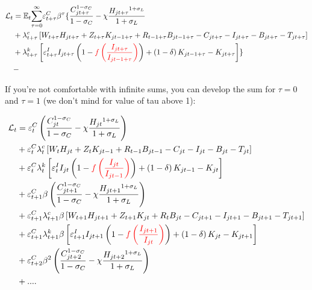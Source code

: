 \documentclass{article}%
\begin{document}
\begin{align*}
\mathcal{L}_{t}  &  =\mathbb{E}_{t}%
{\displaystyle\sum\limits_{\tau=0}^{\infty}}
\varepsilon_{t+\tau}^{C}\beta^{\tau}\{\frac{C_{jt+\tau}^{1-\sigma_{C}}%
}{1-\sigma_{C}}-\chi\frac{H_{jt+\tau}{}^{1+\sigma_{L}}}{1+\sigma_{L}}\\
&  +\lambda_{t+\tau}^{c}\left[  W_{t+\tau}H_{jt+\tau}+Z_{t+\tau}K_{jt-1+\tau
}+R_{t-1+\tau}B_{jt-1+\tau}-C_{jt+\tau}-I_{jt+\tau}-B_{jt+\tau}-T_{jt+\tau
}\right] \\
&  +\lambda_{t+\tau}^{k}\left[  \varepsilon_{t+\tau}^{I}I_{jt+\tau}\left(
1-\textcolor{red}{f\left(\frac{I_{jt+\tau}}{I_{jt-1+\tau}}\right)}\right)
+\left(  1-\delta\right)  K_{jt-1+\tau}-K_{jt+\tau}\right]  \}\\
&  -
\end{align*}


If you're not comfortable with infinite sums, you can develop the sum for
$\tau=0$ and $\tau=1$ (we don't mind for value of tau above 1):%

\begin{align*}
\mathcal{L}_{t}  &  =\varepsilon_{t}^{C}\left(  \frac{C_{jt}^{1-\sigma_{C}}%
}{1-\sigma_{C}}-\chi\frac{H_{jt}{}^{1+\sigma_{L}}}{1+\sigma_{L}}\right) \\
&  +\varepsilon_{t}^{C}\lambda_{t}^{c}\left[  W_{t}H_{jt}+Z_{t}K_{jt-1}%
+R_{t-1}B_{jt-1}-C_{jt}-I_{jt}-B_{jt}-T_{jt}\right] \\
&  +\varepsilon_{t}^{C}\lambda_{t}^{k}\left[  \varepsilon_{t}^{I}I_{jt}\left(
1-\textcolor{red}{f\left(\frac{I_{jt}}{I_{jt-1}}\right)}\right)  +\left(
1-\delta\right)  K_{jt-1}-K_{jt}\right] \\
&  +\varepsilon_{t+1}^{C}\beta\left(  \frac{C_{jt+1}^{1-\sigma_{C}}}%
{1-\sigma_{C}}-\chi\frac{H_{jt+1}{}^{1+\sigma_{L}}}{1+\sigma_{L}}\right) \\
&  +\varepsilon_{t+1}^{C}\lambda_{t+1}^{c}\beta\left[  W_{t+1}H_{jt+1}%
+Z_{t+1}K_{jt}+R_{t}B_{jt}-C_{jt+1}-I_{jt+1}-B_{jt+1}-T_{jt+1}\right] \\
&  +\varepsilon_{t+1}^{C}\lambda_{t+1}^{k}\beta\left[  \varepsilon_{t+1}%
^{I}I_{jt+1}\left(
1-\textcolor{red}{f\left(\frac{I_{jt+1}}{I_{jt}}\right)}\right)  +\left(
1-\delta\right)  K_{jt}-K_{jt+1}\right] \\
&  +\varepsilon_{t+2}^{C}\beta^{2}\left(  \frac{C_{jt+2}^{1-\sigma_{C}}%
}{1-\sigma_{C}}-\chi\frac{H_{jt+2}{}^{1+\sigma_{L}}}{1+\sigma_{L}}\right) \\
&  +....
\end{align*}
\end{document}
